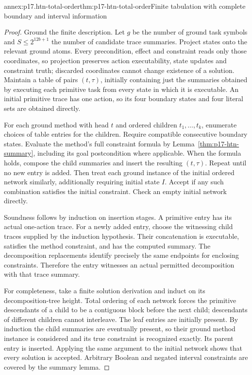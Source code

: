 \begin{annexitem}{annex:p17.htn-total-order}{thm:p17-htn-total-order}{Finite tabulation with complete boundary and interval information}
\begin{proof}
Ground the finite description. Let \(g\) be the number of ground task
symbols and \(S\leq2^{12b+1}\) the number of candidate trace summaries.
Project states onto the relevant ground atoms. Every precondition, effect
and constraint reads only those coordinates, so projection preserves action
executability, state updates and constraint truth; discarded coordinates
cannot change existence of a solution.
Maintain a table of pairs \((t,\tau)\), initially containing just the
summaries obtained by executing each primitive task from every state in
which it is executable. An initial primitive trace has one action, so its
four boundary states and four literal sets are obtained directly.

For each ground method with head \(t\) and ordered children
\(t_1,\ldots,t_k\), enumerate choices of table entries for the children.
Require compatible consecutive boundary states. Evaluate the method's full
constraint formula by Lemma~\ref{thm:p17-htn-summary}, including its goal
postcondition where applicable. When the formula holds, compose the child
summaries and insert the resulting \((t,\tau)\). Repeat until no new
entry is added. Then treat each ground instance of the initial ordered
network similarly, additionally requiring initial state \(I\). Accept if
any such combination satisfies the initial constraint. Check an empty
initial network directly.

Soundness follows by induction on insertion stages. A primitive entry has
its actual one-action trace. For a newly added entry, choose the witnessing
child traces supplied by the induction hypothesis. Their concatenation is
executable, satisfies the method constraint, and has the computed summary.
The decomposition replacements identify precisely the same endpoints for
enclosing constraints. Therefore the entry witnesses an actual permitted
decomposition with that trace summary.

For completeness, take a finite solution derivation and induct on its
decomposition-tree height. Total ordering of each network forces the
primitive descendants of a child to be a contiguous block before the next
child; descendants of different children cannot interleave. The leaf entries
are initially present. By induction the child summaries are eventually
present, so their ground method instance is considered and its true
constraint is recognized exactly. Its parent entry is inserted. Applying
the same argument to the initial network shows that every solution is
accepted. Arbitrary Boolean and negated interval constraints are covered
by the summary lemma.


\end{proof}
\end{annexitem}
